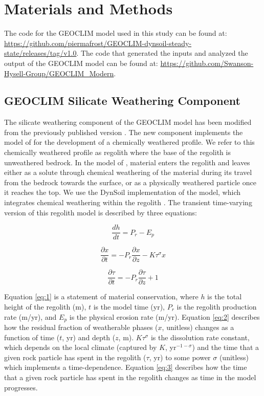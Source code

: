 \section{Materials and Methods}

The code for the GEOCLIM model used in this study can be found at: \url{https://github.com/piermafrost/GEOCLIM-dynsoil-steady-state/releases/tag/v1.0}. The code that generated the inputs and analyzed the output of the GEOCLIM model can be found at: \url{https://github.com/Swanson-Hysell-Group/GEOCLIM_Modern}.

\subsection{GEOCLIM Silicate Weathering Component}

The silicate weathering component of the GEOCLIM model has been modified from the previously published version \citep{Godderis2017b}. The new component implements the model of \citet{Gabet2009a} for the development of a chemically weathered profile. We refer to this chemically weathered profile as regolith where the base of the regolith is unweathered bedrock. In the model of \citet{Gabet2009a}, material enters the regolith and leaves either as a solute through chemical weathering of the material during its travel from the bedrock towards the surface, or as a physically weathered particle once it reaches the top. We use the DynSoil implementation of the \citet{Gabet2009a} model, which integrates chemical weathering within the regolith \citep{West2012a}. The transient time-varying version of this regolith model is described by three equations:

\begin{equation}
    \frac{dh}{dt} = P_{r} - E_{p}
    \label{eq:1}
\end{equation}

\begin{equation}
    \frac{\partial x}{\partial t} = -P_{r} \frac{\partial x}{\partial z} - K \tau^{\sigma}x
    \label{eq:2}
\end{equation}

\begin{equation}
    \frac{\partial \tau}{\partial t} = -P_{r} \frac{\partial \tau}{\partial z} + 1
    \label{eq:3}
\end{equation}

\noindent
Equation \ref{eq:1} is a statement of material conservation, where $h$ is the total height of the regolith (m), $t$ is the model time (yr), $P_{r}$ is the regolith production rate (m/yr), and $E_{p}$ is the physical erosion rate (m/yr). Equation \ref{eq:2} describes how the residual fraction of weatherable phases ($x$, unitless) changes as a function of time ($t$, yr) and depth ($z$, m). $K \tau^{\sigma}$ is the dissolution rate constant, which depends on the local climate (captured by $K$, yr$^{-1-\sigma}$) and the time that a given rock particle has spent in the regolith ($\tau$, yr) to some power $\sigma$ (unitless) which implements a time-dependence. Equation \ref{eq:3} describes how the time that a given rock particle has spent in the regolith changes as time in the model progresses.

